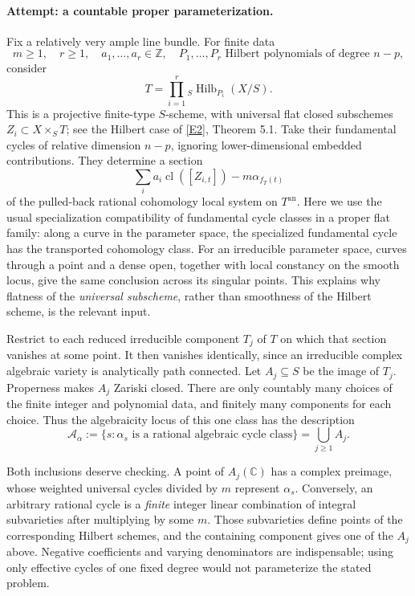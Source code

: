 \documentclass[11pt,a4paper]{article}
\newcommand{\Z}{\mathbb{Z}}
\newcommand{\C}{\mathbb{C}}
\newcommand{\eref}[2]{\hyperlink{extra:#1:#2}{[E#2]}}
\numberwithin{equation}{section}
\begin{document}
\paragraph{Attempt: a countable proper parameterization.}
Fix a relatively very ample line bundle. For finite data
\[
 m\ge1,\quad r\ge1,\quad a_1,\ldots,a_r\in\Z,
 \quad P_1,\ldots,P_r\text{ Hilbert polynomials of degree }n-p,
\]
consider
\begin{equation}\label{eq157-hilbert}
 T=\prod_{i=1}^r{}_S\operatorname{Hilb}_{P_i}(X/S).
\end{equation}
This is a projective finite-type $S$-scheme, with universal flat closed
subschemes $Z_i\subset X\times_ST$; see the Hilbert case of
\eref{157}{2}, Theorem 5.1. Take their fundamental cycles of relative
dimension $n-p$, ignoring lower-dimensional embedded contributions.
They determine a section
\[
 \sum_i a_i\operatorname{cl}([Z_{i,t}])-m\alpha_{f_T(t)}
\]
of the pulled-back rational cohomology local system on $T^{\mathrm{an}}$.
Here we use the usual specialization compatibility of fundamental cycle
classes in a proper flat family: along a curve in the parameter space,
the specialized fundamental cycle has the transported cohomology class.
For an irreducible parameter space, curves through a point and a dense
open, together with local constancy on the smooth locus, give the same
conclusion across its singular points. This explains why flatness of the
\emph{universal subscheme}, rather than smoothness of the Hilbert scheme,
is the relevant input.

Restrict to each reduced irreducible component $T_j$ of $T$ on which that
section vanishes at some point. It then vanishes identically, since an
irreducible complex algebraic variety is analytically path connected.
Let $A_j\subseteq S$ be the image of $T_j$. Properness makes $A_j$ Zariski
closed. There are only countably many choices of the finite integer and
polynomial data, and finitely many components for each choice. Thus the
algebraicity locus of this one class has the description
\begin{equation}\label{eq157-locus}
 \mathcal A_\alpha:=
 \{s:\alpha_s\text{ is a rational algebraic cycle class}\}
 =\bigcup_{j\ge1}A_j.
\end{equation}

Both inclusions deserve checking. A point of $A_j(\C)$ has a complex
preimage, whose weighted universal cycles divided by $m$ represent
$\alpha_s$. Conversely, an arbitrary rational cycle is a \emph{finite}
integer linear combination of integral subvarieties after multiplying by
some $m$. Those subvarieties define points of the corresponding Hilbert
schemes, and the containing component gives one of the $A_j$ above.
Negative coefficients and varying denominators are indispensable; using
only effective cycles of one fixed degree would not parameterize the
stated problem.
\end{document}
